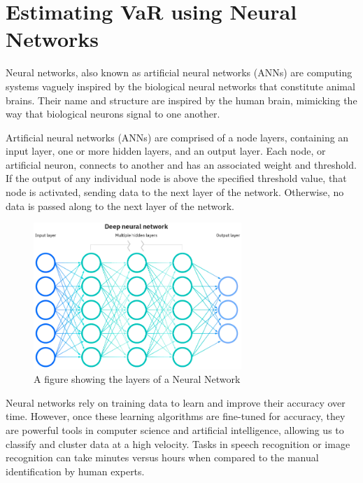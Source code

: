 \documentclass[a4paper,11pt,oneside]{book}
\begin{document}

\chapter{Estimating VaR using Neural Networks
}
Neural networks, also known as artificial neural networks (ANNs) are computing systems vaguely inspired by the biological neural networks that constitute animal brains. Their name and structure are inspired by the human brain, mimicking the way that biological neurons signal to one another.\newline\newline

Artificial neural networks (ANNs) are comprised of a node layers, containing an input layer, one or more hidden layers, and an output layer. Each node, or artificial neuron, connects to another and has an associated weight and threshold. If the output of any individual node is above the specified threshold value, that node is activated, sending data to the next layer of the network. Otherwise, no data is passed along to the next layer of the network.
\begin{figure}[!h]
	\centering
	\includegraphics[width=0.7\textwidth]{figures/NN}
	\caption{A figure showing the layers of a Neural Network}
	\label{firstfig}
\end{figure}\newline
Neural networks rely on training data to learn and improve their accuracy over time. However, once these learning algorithms are fine-tuned for accuracy, they are powerful tools in computer science and artificial intelligence, allowing us to classify and cluster data at a high velocity. Tasks in speech recognition or image recognition can take minutes versus hours when compared to the manual identification by human experts.
\end{document}
